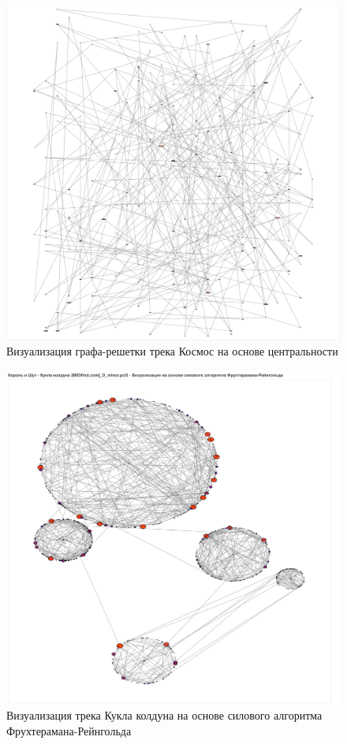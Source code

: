 \documentclass{article}
\begin{document}
\begin{figure}[h]
	\centering
	\includegraphics[scale=0.6]{tools/space_5.png}
	\caption{Визуализация графа-решетки трека Космос на основе центральности}
\end{figure}

\begin{figure}[h]
	\centering
	\includegraphics[scale=0.6]{tools/king_2.png}
	\caption{Визуализация трека Кукла колдуна на основе силового алгоритма Фрухтерамана-Рейнгольда}
\end{figure}
\end{document}

